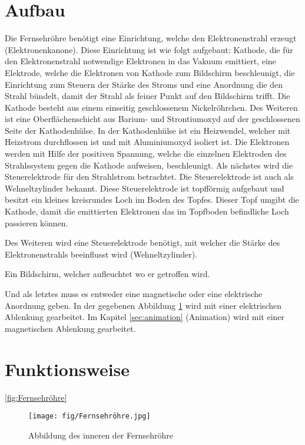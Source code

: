 \section{Aufbau}
Die Fernsehröhre benötigt eine Einrichtung, welche den Elektronenstrahl erzeugt (Elektronenkanone).
Diese Einrichtung ist wie folgt aufgebaut: Kathode, die für den Elektronenstrahl notwendige Elektronen in das Vakuum emittiert, eine Elektrode, welche die Elektronen von Kathode zum Bildschirm beschleunigt, die Einrichtung zum Steuern der Stärke des Stroms und eine Anordnung die den Strahl bündelt, damit der Strahl als feiner Punkt auf den Bildschirm trifft. 
Die Kathode besteht aus einem einseitig geschlossenem Nickelröhrchen.
Des Weiteren ist eine Oberflächenschicht aus Barium- und Strontiumoxyd auf der geschlossenen Seite der Kathodenhülse.
In der Kathodenhülse ist ein Heizwendel, welcher mit Heizstrom durchflossen ist und mit Aluminiumoxyd isoliert ist.
Die Elektronen werden mit Hilfe der positiven Spannung, welche die einzelnen Elektroden des Strahlssystem gegen die Kathode aufweisen, beschleunigt.
Als nächstes wird die Steuerelektrode für den Strahlstrom betrachtet.
Die Steuerelektrode ist auch als Wehneltzylinder bekannt.
Diese Steuerelektrode ist topfförmig aufgebaut und besitzt ein kleines kreisrundes Loch im Boden des Topfes.
Dieser Topf umgibt die Kathode, damit die emittierten Elektronen das im Topfboden befindliche Loch passieren können.


Des Weiteren wird eine Steuerelektrode benötigt, mit welcher die Stärke des Elektronenstrahls beeinflusst wird (Wehneltzylinder).

Ein Bildschirm, welcher aufleuchtet wo er getroffen wird.

Und als letztes muss es entweder eine magnetische oder eine elektrische Anordnung geben.
In der gegebenen Abbildung \ref{fig:Fernsehroehre} wird mit einer elektrischen Ablenkung gearbeitet.
Im Kapitel \ref{sec:animation} (Animation) wird mit einer magnetischen Ablenkung gearbeitet.

\section{Funktionsweise}

\ref{fig:Fernsehröhre} \cite{Abbildung}
\cite{Fernsehroehre}
\cite{Roehrenfernsehr}
\begin{figure}
    \centering
    \texttt{[image: fig/Fernsehröhre.jpg]}
    \caption{Abbildung des inneren der Fernsehröhre}
    \label{fig:Fernsehroehre}
\end{figure}
